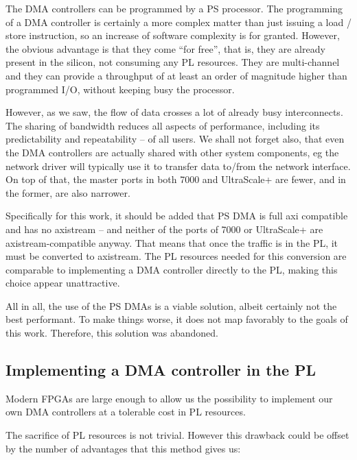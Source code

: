 The DMA controllers can be programmed by a PS processor. The programming of a DMA controller
is certainly a more complex matter than just issuing a load / store instruction,
so an increase of software complexity is for granted. 
However, the obvious advantage is that they come ``for free'', that is,
they are already present in the silicon, not consuming any PL resources.
They are multi-channel and they can provide a throughput of at least an order
of magnitude higher than programmed I/O, without keeping busy the processor.

However, as we saw, the flow of data crosses a lot of already busy interconnects.
The sharing of bandwidth reduces all aspects of performance, 
including its predictability and repeatability -- of all users.
We shall not forget also, that even the DMA controllers are actually shared with
other system components, eg the network driver will typically use it to transfer data
to/from the network interface. On top of that, the master ports in both 7000 and UltraScale+
are fewer, and in the former, are also narrower.

Specifically for this work, it should be added that PS DMA is full \gls{axi} compatible
and has no \gls{axistream} -- and neither of the ports of 7000 or UltraScale+ are 
\gls{axistream}-compatible anyway. That means that once the traffic is in the PL,
it must be converted to \gls{axistream}. 
The PL resources needed for this conversion are comparable to implementing a DMA
controller directly to the PL, making this choice appear unattractive.

All in all, the use of the PS DMAs is a viable solution, 
albeit certainly not the best performant. 
To make things worse, it does not map favorably to the goals of this work.
Therefore, this solution was abandoned.

\subsection{Implementing a DMA controller in the PL}

Modern FPGAs are large enough to allow us 
the possibility to implement our own DMA controllers 
at a tolerable cost in PL resources. 

The sacrifice of PL resources is not trivial.
However this drawback could be offset by the number of
advantages that this method gives us:

